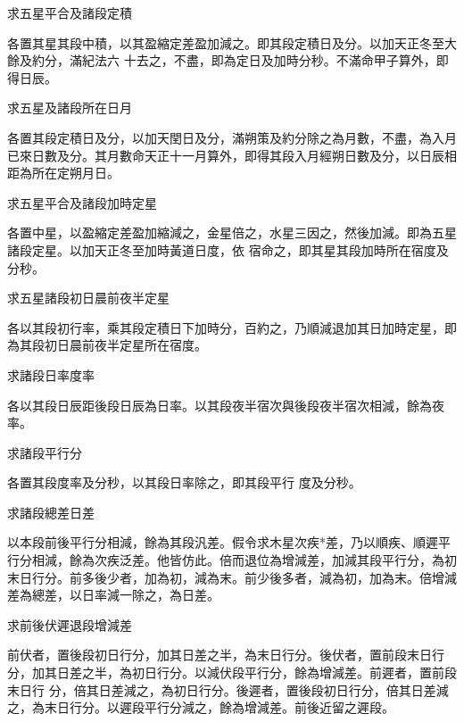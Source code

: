 \begin{pinyinscope}
 求五星平合及諸段定積



 各置其星其段中積，以其盈縮定差盈加減之。即其段定積日及分。以加天正冬至大餘及約分，滿紀法六
 十去之，不盡，即為定日及加時分秒。不滿命甲子算外，即得日辰。



 求五星及諸段所在日月



 各置其段定積日及分，以加天閏日及分，滿朔策及約分除之為月數，不盡，為入月已來日數及分。其月數命天正十一月算外，即得其段入月經朔日數及分，以日辰相距為所在定朔月日。



 求五星平合及諸段加時定星



 各置中星，以盈縮定差盈加縮減之，金星倍之，水星三因之，然後加減。即為五星諸段定星。以加天正冬至加時黃道日度，依
 宿命之，即其星其段加時所在宿度及分秒。



 求五星諸段初日晨前夜半定星



 各以其段初行率，乘其段定積日下加時分，百約之，乃順減退加其日加時定星，即為其段初日晨前夜半定星所在宿度。



 求諸段日率度率



 各以其段日辰距後段日辰為日率。以其段夜半宿次與後段夜半宿次相減，餘為夜率。



 求諸段平行分



 各置其段度率及分秒，以其段日率除之，即其段平行
 度及分秒。



 求諸段總差日差



 以本段前後平行分相減，餘為其段汎差。假令求木星次疾*差，乃以順疾、順遲平行分相減，餘為次疾泛差。他皆仿此。倍而退位為增減差，加減其段平行分，為初末日行分。前多後少者，加為初，減為末。前少後多者，減為初，加為末。倍增減差為總差，以日率減一除之，為日差。



 求前後伏遲退段增減差



 前伏者，置後段初日行分，加其日差之半，為末日行分。後伏者，置前段末日行分，加其日差之半，為初日行分。以減伏段平行分，餘為增減差。前遲者，置前段末日行
 分，倍其日差減之，為初日行分。後遲者，置後段初日行分，倍其日差減之，為末日行分。以遲段平行分減之，餘為增減差。前後近留之遲段。




\end{pinyinscope}
